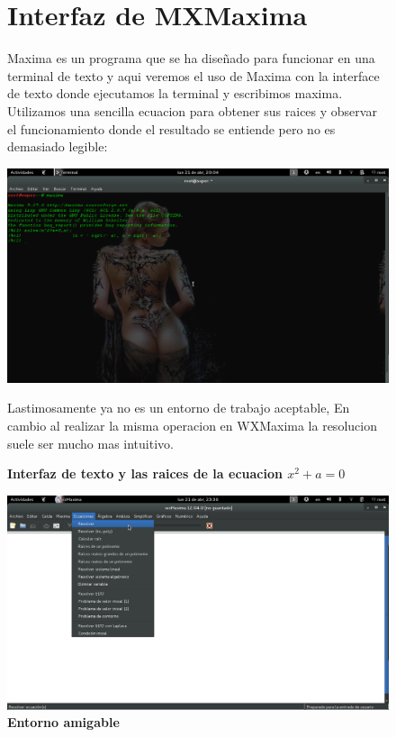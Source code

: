 \documentclass[10pt,a4paper]{book}
\begin{document}
\begin{small}
\begin{figure}[htb]
\section{Interfaz de MXMaxima}

Maxima es un programa que se ha diseñado para funcionar en una terminal de texto y aqui veremos el uso de Maxima con la interface de texto donde ejecutamos la terminal y escribimos maxima.\\

Utilizamos una sencilla ecuacion para obtener sus raices y observar el funcionamiento donde el resultado se entiende pero no es demasiado legible:\\
\begin{center}
\includegraphics[width=13cm]{fotos/cap8}
\caption{\textbf{Interfaz de texto y las raices de la ecuacion $x^2+a=0$}}


\end{center}
Lastimosamente ya no es un entorno de trabajo aceptable, En cambio al realizar la misma operacion en WXMaxima la resolucion suele ser mucho mas intuitivo.
\end{figure}

\begin{figure}[htb]
\begin{center}
\includegraphics[width=13cm]{fotos/cap9.png}
\caption{\textbf{Entorno amigable}}
\end{center}
\end{figure}


\end{small}
\end{document}
